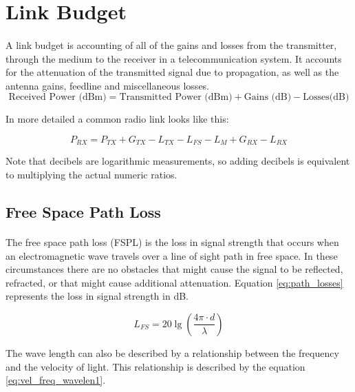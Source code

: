 \section{Link Budget}\label{subsec:link_budget}
\paragraph{}
A link budget is accounting of all of the gains and losses from the transmitter, through the medium  to the receiver in a telecommunication system. It accounts for the attenuation of the transmitted signal due to propagation, as well as the antenna gains, feedline and miscellaneous losses. 
\begin{equation*}\label{eq:link_budget} 
 		\text{Received Power (dBm)} = \text{Transmitted Power (dBm)} + \text{Gains (dB)} - \text{Losses(dB)}
\end{equation*}

In more detailed a common radio link looks like this:

\begin{equation*}\label{eq:link_budget} 
 		P_{RX} = P_{TX} + G_{TX} - L_{TX} - L_{FS} - L_{M} + G_{RX} - L_{RX}
\end{equation*}

Note that decibels are logarithmic measurements, so adding decibels is equivalent to multiplying the actual numeric ratios.

\subsection{Free Space Path Loss}\label{subsec:path_loss}
\paragraph{}
The free space path loss (FSPL) is the loss in signal strength that occurs when an electromagnetic wave travels over a line of sight path in free space. In these circumstances there are no obstacles that might cause the signal to be reflected, refracted, or that might cause additional attenuation. Equation \ref{eq:path_losses} represents the loss in signal strength in dB.

\begin{equation}\label{eq:path_losses}
	L_{FS} = 20\lg\left (\frac{4\pi \cdot d}{\lambda} \right)
\end{equation}

The wave length can also be described by a relationship between the frequency and the velocity of light. This relationship is described by the equation \ref{eq:vel_freq_wavelen1}.

